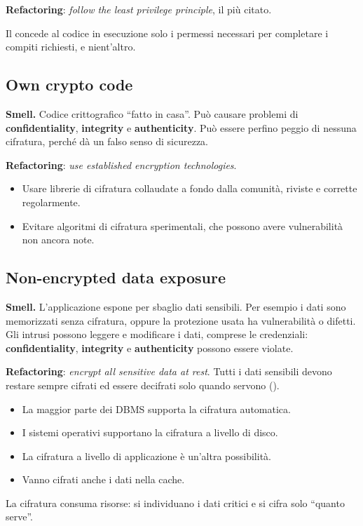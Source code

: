 \textbf{Refactoring}: \emph{follow the least privilege principle}, il più citato.

\begin{definizione}
Il  concede al codice in esecuzione solo i permessi necessari per completare i
compiti richiesti, e nient'altro.
\end{definizione}

\subsection{Own crypto code}

\textbf{Smell.} Codice crittografico ``fatto in casa''. Può causare problemi di \textbf{confidentiality},
\textbf{integrity} e \textbf{authenticity}. Può essere perfino peggio di nessuna cifratura, perché dà un falso senso di
sicurezza.

\textbf{Refactoring}: \emph{use established encryption technologies}.
\begin{itemize}
  \item Usare librerie di cifratura collaudate a fondo dalla comunità, riviste e corrette regolarmente.
  \item Evitare algoritmi di cifratura sperimentali, che possono avere vulnerabilità non ancora note.
\end{itemize}

\subsection{Non-encrypted data exposure}

\textbf{Smell.} L'applicazione espone per sbaglio dati sensibili. Per esempio i dati sono memorizzati senza cifratura,
oppure la protezione usata ha vulnerabilità o difetti. Gli intrusi possono leggere e modificare i dati, comprese le
credenziali: \textbf{confidentiality}, \textbf{integrity} e \textbf{authenticity} possono essere violate.

\textbf{Refactoring}: \emph{encrypt all sensitive data at rest}. Tutti i dati sensibili devono restare sempre cifrati
ed essere decifrati solo quando servono ().
\begin{itemize}
  \item La maggior parte dei DBMS supporta la cifratura automatica.
  \item I sistemi operativi supportano la cifratura a livello di disco.
  \item La cifratura a livello di applicazione è un'altra possibilità.
  \item Vanno cifrati anche i dati nella cache.
\end{itemize}
La cifratura consuma risorse: si individuano i dati critici e si cifra solo ``quanto serve''.

